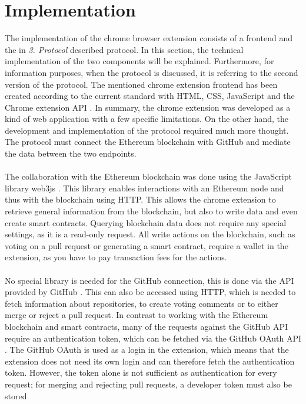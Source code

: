 \documentclass[sigconf]{acmart}
\begin{document}
\section{Implementation}
The implementation of the chrome browser extension consists of a frontend and the in \textit{3. Protocol} described protocol.
In this section, the technical implementation of the two components will be explained. Furthermore, for information purposes, 
when the protocol is discussed, it is referring to the second version of the protocol.
The mentioned chrome extension frontend has been created according to the current standard with HTML, CSS, JavaScript 
and the Chrome extension API \cite{chrome2021api}. In summary, the chrome extension was developed as a kind of web application 
with a few specific limitations. On the other hand, the development and implementation of the protocol required much more thought.
The protocol must connect the Ethereum blockchain with GitHub and mediate the data between the two endpoints. \\ \\
The collaboration with the Ethereum blockchain was done using the JavaScript library web3js \cite{web32021js}. 
This library enables interactions with an 
Ethereum node and thus with the blockchain using HTTP. This allows the chrome extension to retrieve general information from the 
blockchain, but also to write data and even create smart contracts. Querying blockchain data does not require any special settings, 
as it is a read-only request. All write actions on the blockchain, such as voting on a pull request or generating a smart contract, require
 a wallet in the extension, as you have to pay transaction fees for the actions. \\ \\
No special library is needed for the GitHub connection, this is done via the API provided by GitHub \cite{git2021api}. 
This can also be accessed using 
HTTP, which is needed to fetch information about repositories, to create voting comments or to either merge or reject a pull request.
In contrast to working with the Ethereum blockchain and smart contracts, many of the requests against the GitHub API require an 
authentication token, which can be fetched via the GitHub OAuth API \cite{git2021auth}. The GitHub OAuth is used as a login in the extension, which
 means that the extension does not need its own login and can therefore fetch the authentication token. However, the token alone 
is not sufficient as authentication for every request; for merging and rejecting pull requests, a developer token must also be stored 
\end{document}
